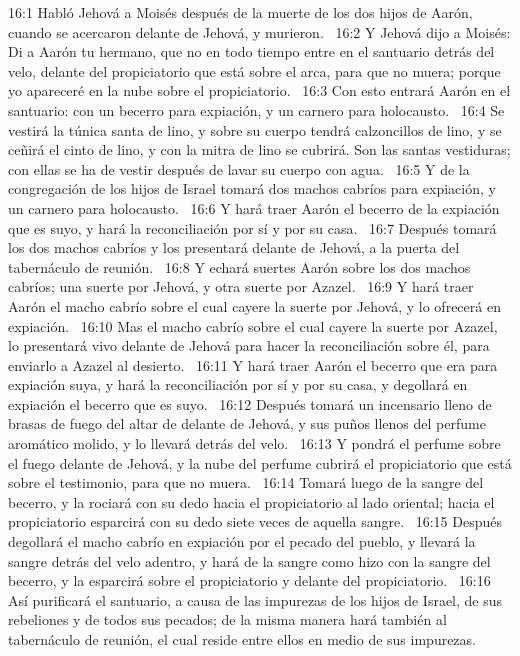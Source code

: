 16:1 Habló Jehová a Moisés después de la muerte de los dos hijos de Aarón, cuando se acercaron delante de Jehová, y murieron.  
16:2 Y Jehová dijo a Moisés: Di a Aarón tu hermano, que no en todo tiempo entre en el santuario detrás del velo, delante del propiciatorio que está sobre el arca, para que no muera; porque yo apareceré en la nube sobre el propiciatorio.  
16:3 Con esto entrará Aarón en el santuario: con un becerro para expiación, y un carnero para holocausto.  
16:4 Se vestirá la túnica santa de lino, y sobre su cuerpo tendrá calzoncillos de lino, y se ceñirá el cinto de lino, y con la mitra de lino se cubrirá. Son las santas vestiduras; con ellas se ha de vestir después de lavar su cuerpo con agua.  
16:5 Y de la congregación de los hijos de Israel tomará dos machos cabríos para expiación, y un carnero para holocausto.  
16:6 Y hará traer Aarón el becerro de la expiación que es suyo, y hará la reconciliación por sí y por su casa.  
16:7 Después tomará los dos machos cabríos y los presentará delante de Jehová, a la puerta del tabernáculo de reunión.  
16:8 Y echará suertes Aarón sobre los dos machos cabríos; una suerte por Jehová, y otra suerte por Azazel.  
16:9 Y hará traer Aarón el macho cabrío sobre el cual cayere la suerte por Jehová, y lo ofrecerá en expiación.  
16:10 Mas el macho cabrío sobre el cual cayere la suerte por Azazel, lo presentará vivo delante de Jehová para hacer la reconciliación sobre él, para enviarlo a Azazel al desierto.  
16:11 Y hará traer Aarón el becerro que era para expiación suya, y hará la reconciliación por sí y por su casa, y degollará en expiación el becerro que es suyo.  
16:12 Después tomará un incensario lleno de brasas de fuego del altar de delante de Jehová, y sus puños llenos del perfume aromático molido, y lo llevará detrás del velo.  
16:13 Y pondrá el perfume sobre el fuego delante de Jehová, y la nube del perfume cubrirá el propiciatorio que está sobre el testimonio, para que no muera.  
16:14 Tomará luego de la sangre del becerro, y la rociará con su dedo hacia el propiciatorio al lado oriental; hacia el propiciatorio esparcirá con su dedo siete veces de aquella sangre.  
16:15 Después degollará el macho cabrío en expiación por el pecado del pueblo, y llevará la sangre detrás del velo adentro, y hará de la sangre como hizo con la sangre del becerro, y la esparcirá sobre el propiciatorio y delante del propiciatorio.  
16:16 Así purificará el santuario, a causa de las impurezas de los hijos de Israel, de sus rebeliones y de todos sus pecados; de la misma manera hará también al tabernáculo de reunión, el cual reside entre ellos en medio de sus impurezas.  
